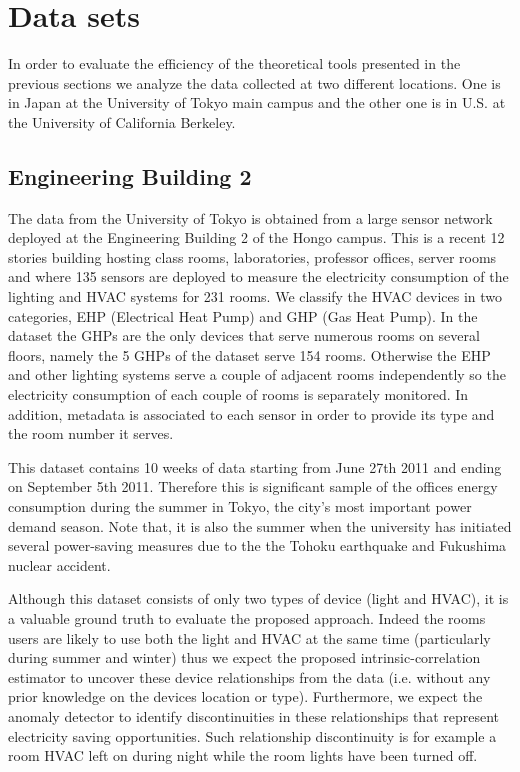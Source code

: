 \section{Data sets}
In order to evaluate the efficiency of the theoretical tools presented in the previous sections we analyze the data collected at two different locations.
One is in Japan at the University of Tokyo main campus and the other one is in U.S. at the University of California Berkeley.

\subsection{Engineering Building 2} \label{data:engbldg2}
The data from the University of Tokyo is obtained from a large sensor network deployed at the Engineering Building 2 of the Hongo campus. 
This is a recent 12 stories building hosting class rooms, laboratories, professor offices, server rooms and where 135 sensors are deployed to measure the electricity consumption of the lighting and HVAC systems for 231 rooms.
We classify the HVAC devices in two categories, EHP (Electrical Heat Pump) and GHP (Gas Heat Pump).
In the dataset the GHPs are the only devices that serve numerous rooms on several floors, namely the 5 GHPs of the dataset serve 154 rooms.
Otherwise the EHP and other lighting systems serve a couple of adjacent rooms independently so the electricity consumption of each couple of rooms  is separately monitored.
In addition, metadata is associated to each sensor in order to provide its type and the room number it serves.

This dataset contains 10 weeks of data starting from June 27th 2011 and ending on September 5th 2011.
Therefore this is significant sample of the offices energy consumption during the summer in Tokyo, the city's most important power demand season.
Note that, it is also the summer when the university has initiated several power-saving measures due to the the Tohoku earthquake and Fukushima nuclear accident.

Although this dataset consists of only two types of device (light and HVAC), it is a valuable ground truth to evaluate the proposed approach.
Indeed the rooms users are likely to use both the light and HVAC at the same time (particularly during summer and winter) thus we expect the proposed intrinsic-correlation estimator to uncover these device relationships from the data (i.e. without any prior knowledge on the devices location or type).
Furthermore, we expect the anomaly detector to identify discontinuities in these relationships that represent electricity saving opportunities.
Such relationship discontinuity is for example a room HVAC left on during night while the room lights have been turned off.


